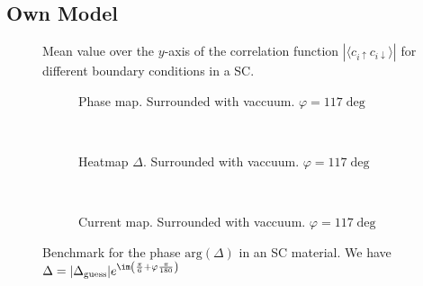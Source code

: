 \documentclass[../main.tex]{subfiles}
\begin{document}
\subsection{Own Model}
\begin{figure}[H]
    \centering
    
    \caption{Mean value over the $y$-axis of the correlation function $|\langle c_{i\uparrow} c_{i\downarrow}\rangle|$ for different boundary conditions in a SC.}
\end{figure}
\begin{figure}[H]
    \begin{subfigure}{0.4\textwidth}
        \centering
        \hspace{-4cm} %
        
        \caption{Phase map. Surrounded with vaccuum. $\varphi = 117\deg$}
        \label{fig:first}
    \end{subfigure}    \\
    \begin{subfigure}{0.4\textwidth}
        \centering
        \hspace{-4cm} %
        
        \caption{Heatmap $\Delta$. Surrounded with vaccuum. $\varphi = 117\deg$}
        \label{fig:first}
    \end{subfigure}    \\
    \hspace{0.1\textwidth}
    \begin{subfigure}{0.4\textwidth}
        \centering
        
        \caption{Current map. Surrounded with vaccuum. $\varphi = 117 \deg$}
        \label{fig:first}
    \end{subfigure}

    \caption{Benchmark for the phase $\text{arg}(\Delta)$ in an SC material. We have $\Delta = |\Delta_{\text{guess}}|e^{\im \left(\frac{\pi}{6} + \varphi\frac{\pi}{180}\right)}$}
\end{figure}    
\end{document}

